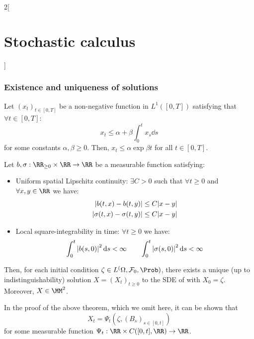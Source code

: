 \documentclass[../../../main_math.tex]{subfiles}
\begin{document}
\begin{multicols}{2}[\section{Stochastic calculus}]
  \subsubsection{Existence and uniqueness of solutions}
  \begin{lemma}\label{SC:gronwall}
    Let ${(x_t)}_{t\in[0,T]}$ be a non-negative function in $L^1([0,T])$ satisfying that $\forall t\in[0,T]$:
    $$
      x_t\leq \alpha+\beta\int_0^t x_s\dd{s}
    $$
    for some constants $\alpha,\beta\geq 0$. Then, $x_t\leq \alpha\exp{\beta t}$ for all $t\in[0,T]$.
  \end{lemma}
  \begin{theorem}\label{SC:existence_uniqueness_SDE}
    Let $b,\sigma:\RR_{\geq 0}\times\RR\to \RR$ be a measurable function satisfying:
    \begin{itemize}
      \item Uniform spatial Lipschitz continuity: $\exists C>0$ such that $\forall t\geq 0$ and $\forall x,y\in\RR$ we have:
            \begin{align*}
              \abs{b(t,x)-b(t,y)}           & \leq C\abs{x-y} \\
              \abs{\sigma(t,x)-\sigma(t,y)} & \leq C\abs{x-y}
            \end{align*}
      \item Local square-integrability in time: $\forall t \geq 0$ we have: $$\int_0^t \abs{b(s,0)}^2\dd{s}<\infty
              \qquad \int_0^t \abs{\sigma(s,0)}^2\dd{s}<\infty
            $$
    \end{itemize}
    Then, for each initial condition $\zeta\in L^(\Omega,\mathcal{F}_0,\Prob)$, there exists a unique (up to indistinguishability) solution $X={(X_t)}_{t\geq 0}$ to the SDE of  with $X_0=\zeta$. Moreover, $X\in \MM^2$.
  \end{theorem}
  \begin{remark}
    In the proof of the above theorem, which we omit here, it can be shown that
    \begin{equation}\label{SC:expression_x_psi}
      X_t=\Psi_t\left(\zeta,{(B_s)}_{s\in[0,t]}\right)
    \end{equation}
    for some measurable function $\Psi_t:\RR\times C([0,t],\RR)\to \RR$.
  \end{remark}

\end{multicols}
\end{document}
